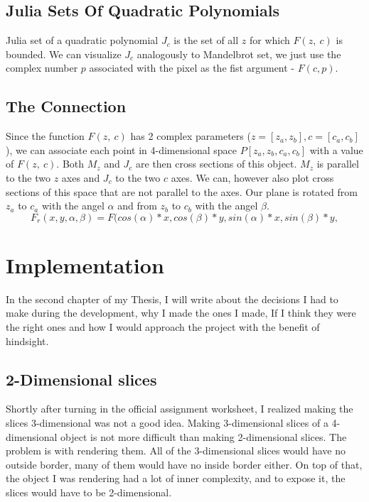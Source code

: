 \documentclass[11pt,a4paper,twoside,openright]{report}
\begin{document}
\section{Julia Sets Of Quadratic Polynomials}
Julia set of a quadratic polynomial $J_c$ is the set of all $z$ for which $F(z,\:c)$ is bounded.\cite{julia_set_wiki}\cite{julia_set_wolfram} We can visualize $J_c$ analogously to Mandelbrot set, we just use the complex number $p$ associated with the pixel as the fist argument - $F(c, p)$. 

\section{The Connection}
Since the function $F(z,\:c)$ has 2 complex parameters ($z = [z_a, z_b], c = [c_a, c_b]$), we can associate each point in 4-dimensional space $P[z_a, z_b, c_a, c_b]$ with a value of $F(z,\:c)$. Both $M_z$ and $J_c$ are then cross sections of this object. $M_z$ is parallel to the two $z$ axes and $J_c$ to the two $c$ axes. We can, however also plot cross sections of this space that are not parallel to the axes. Our plane is rotated from $z_a$ to $c_a$ with the angel $\alpha$ and from $z_b$ to $c_b$ with the angel $\beta$.
\[F_r(x, y, \alpha, \beta) = F(cos(\alpha)*x, cos(\beta)*y, sin(\alpha)*x, sin(\beta)*y,\]


\chapter{Implementation}
In the second chapter of my Thesis, I will write about the decisions I had to make during the development, why I made the ones I made, If I think they were the right ones and how I would approach the project with the benefit of hindsight.
\section{2-Dimensional slices}
Shortly after turning in the official assignment worksheet, I realized making the slices 3-dimensional was not a good idea. Making 3-dimensional slices of a 4-dimensional object is not more difficult than making 2-dimensional slices. The problem is with rendering them. All of the 3-dimensional slices would have no outside border, many of them would have no inside border either. On top of that, the object I was rendering had a lot of inner complexity, and to expose it, the slices would have to be 2-dimensional.
\end{document}
